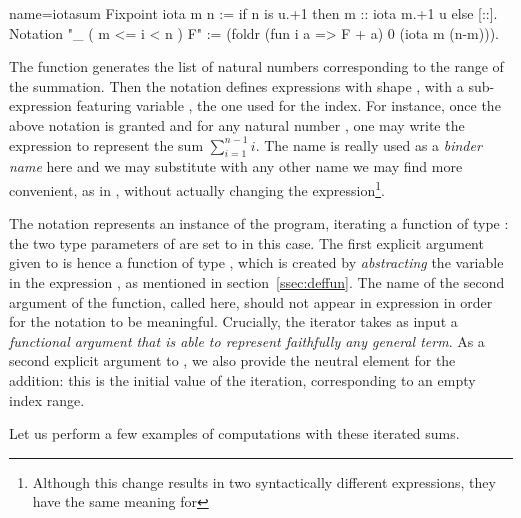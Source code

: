 \begin{coq}{name=iotasum}{}
Fixpoint iota m n := if n is u.+1 then m :: iota m.+1 u else [::].
Notation "\sum_ ( m <= i < n ) F" :=
  (foldr (fun i a => F + a) 0 (iota m (n-m))).
\end{coq}
\index[coq]{\C{\\sum}}

The  function generates the list
\C{[:: m; m+1; ...; m+n-1]}
of natural numbers
corresponding to the range of the summation. Then the notation defines
expressions with shape , with  a
sub-expression featuring variable , the one used for the
index. For instance, once the above notation is granted and for any
natural number , one may write
the \Coq{} expression  to represent the
sum $\sum\limits_{i=1}^{n-1} i$. The name  is really used as a
\emph{binder name} here and we may substitute  with any other
name we may find more convenient, as in ,
without actually changing the expression\footnote{Although this change
results in two syntactically different expressions, they have the same
meaning for \Coq{}}.

The notation represents an instance of the  program, iterating
a function of type : the two type parameters of
 are set to  in this case. The first explicit
argument given to  is hence a function of
type , which is created by \emph{abstracting} the
variable  in the expression , as mentioned in
section~\ref{ssec:deffun}. The name of the second argument of the
function, called  here, should not appear in expression  in
order for the notation to be meaningful.
Crucially, the 
iterator takes as
input a \emph{functional argument that is able to represent faithfully
  any general term}. As a second explicit argument to , we
also provide the neutral element  for the addition: this is the
initial value of the iteration, corresponding to an empty index range.

Let us perform a few examples of computations with these iterated sums.

